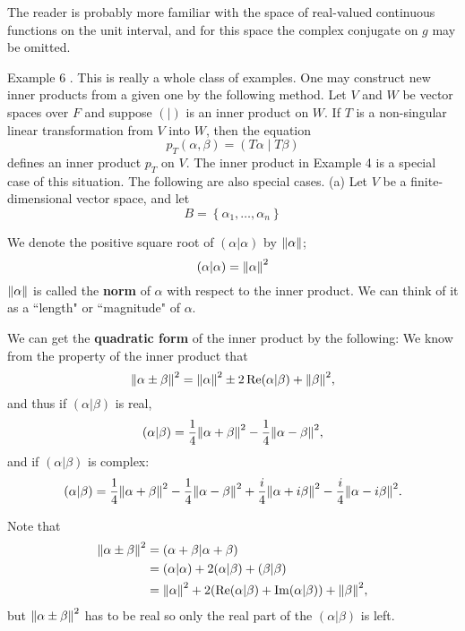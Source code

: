\documentclass[main.tex]{subfiles}
\begin{document}
The reader is probably more familiar with the space of real-valued continuous functions on the unit interval, and for this space the complex conjugate on $g$ may be omitted.

Example 6 . This is really a whole class of examples. One may construct new inner products from a given one by the following method. Let $V$ and $W$ be vector spaces over $F$ and suppose $(\mid)$ is an inner product on $W$. If $T$ is a non-singular linear transformation from $V$ into $W$, then the equation
$$
p_T(\alpha, \beta)=(T \alpha \mid T \beta)
$$
defines an inner product $p_T$ on $V$. The inner product in Example 4 is a special case of this situation. The following are also special cases.
(a) Let $V$ be a finite-dimensional vector space, and let
$$
B=\left\{\alpha_1, \ldots, \alpha_n\right\}
$$


\begin{definition}
We denote the positive square root of $(\alpha|\alpha)$ by $\norm{\alpha}$;
\begin{equation}
    (\alpha|\alpha) = \norm{\alpha}^2
\end{equation}
$\norm{\alpha}$ is called the \textbf{norm} of $\alpha$ with respect to the inner product. We can think of it as a ``length" or ``magnitude" of $\alpha$. 
\end{definition}


\begin{definition}
We can get the \textbf{quadratic form} of the inner product by the following:
We know from the property of the inner product that
\begin{equation}
    \norm{\alpha \pm \beta}^2 = \norm{\alpha}^2 \pm 2 \Re (\alpha | \beta) + \norm{\beta}^2,
\end{equation}
and thus if $(\alpha | \beta)$ is real, 
\begin{equation}
    (\alpha | \beta) = \frac{1}{4} \norm{\alpha + \beta}^2 - \frac{1}{4} \norm{\alpha - \beta}^2,
\end{equation}
and if $(\alpha | \beta)$ is complex: 
\begin{equation}
    (\alpha | \beta) = \frac{1}{4} \norm{\alpha + \beta}^2 - \frac{1}{4} \norm{\alpha - \beta}^2 + \frac{i}{4} \norm{\alpha + i\beta}^2 - \frac{i}{4} \norm{\alpha - i\beta}^2.
\end{equation}
\end{definition}

\begin{note}
Note that
\begin{align*}
\norm{\alpha \pm \beta}^2 &= (\alpha + \beta|\alpha + \beta)\\
&=(\alpha|\alpha) + 2(\alpha|\beta) + (\beta|\beta)\\
& = \norm{\alpha}^2 + 2(\Re (\alpha|\beta) + \Im (\alpha | \beta)) + \norm{\beta}^2,
\end{align*}
but $\norm{\alpha \pm \beta}^2$ has to be real so only the real part of the $(\alpha |\beta)$ is left. 
\end{note}
\end{document}
